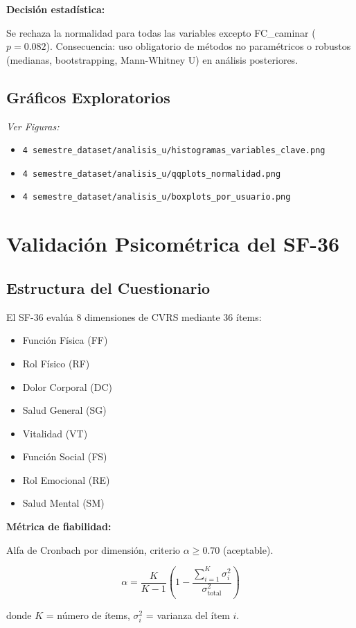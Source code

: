 \documentclass[12pt,letterpaper,twoside]{report}
\begin{document}
\begin{decisionbox}
\textbf{Decisión estadística:}

Se rechaza la normalidad para todas las variables excepto FC\_caminar ($p=0.082$). Consecuencia: uso obligatorio de métodos no paramétricos o robustos (medianas, bootstrapping, Mann-Whitney U) en análisis posteriores.
\end{decisionbox}

\subsection{Gráficos Exploratorios}

\textit{Ver Figuras:}
\begin{itemize}[noitemsep]
    \item \texttt{4 semestre\_dataset/analisis\_u/histogramas\_variables\_clave.png}
    \item \texttt{4 semestre\_dataset/analisis\_u/qqplots\_normalidad.png}
    \item \texttt{4 semestre\_dataset/analisis\_u/boxplots\_por\_usuario.png}
\end{itemize}

\section{Validación Psicométrica del SF-36}

\subsection{Estructura del Cuestionario}

El SF-36 evalúa 8 dimensiones de CVRS mediante 36 ítems:
\begin{itemize}[noitemsep]
    \item Función Física (FF)
    \item Rol Físico (RF)
    \item Dolor Corporal (DC)
    \item Salud General (SG)
    \item Vitalidad (VT)
    \item Función Social (FS)
    \item Rol Emocional (RE)
    \item Salud Mental (SM)
\end{itemize}

\begin{estadisticobox}
\textbf{Métrica de fiabilidad:}

Alfa de Cronbach por dimensión, criterio $\alpha \geq 0.70$ (aceptable).

\begin{equation}
\alpha = \frac{K}{K-1} \left( 1 - \frac{\sum_{i=1}^{K} \sigma^2_i}{\sigma^2_{\text{total}}} \right)
\end{equation}

donde $K$ = número de ítems, $\sigma^2_i$ = varianza del ítem $i$.
\end{estadisticobox}
\end{document}
